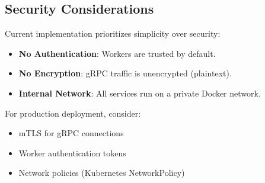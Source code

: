 \subsection{Security Considerations}

Current implementation prioritizes simplicity over security:
\begin{itemize}
    \item \textbf{No Authentication}: Workers are trusted by default.
    \item \textbf{No Encryption}: gRPC traffic is unencrypted (plaintext).
    \item \textbf{Internal Network}: All services run on a private Docker network.
\end{itemize}

For production deployment, consider:
\begin{itemize}
    \item mTLS for gRPC connections
    \item Worker authentication tokens
    \item Network policies (Kubernetes NetworkPolicy)
\end{itemize}
